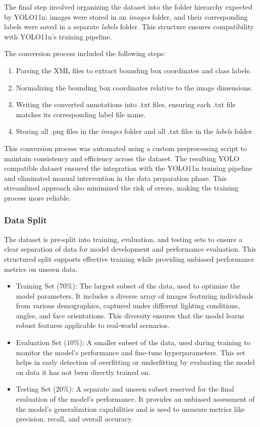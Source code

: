 \documentclass[11pt]{article}
\begin{document}
The final step involved organizing the dataset into the folder hierarchy expected by YOLO11n: images were stored in an \textit{images} folder, and their corresponding labels were saved in a separate \textit{labels} folder. This structure ensures compatibility with YOLO11n's training pipeline.

The conversion process included the following steps:

\begin{enumerate} 
    \item Parsing the XML files to extract bounding box coordinates and class labels. 
    \item Normalizing the bounding box coordinates relative to the image dimensions. 
    \item Writing the converted annotations into .txt files, ensuring each .txt file matches its corresponding label file name. 
    \item Storing all .png files in the \textit{images} folder and all .txt files in the \textit{labels} folder.
\end{enumerate}

This conversion process was automated using a custom preprocessing script to maintain consistency and efficiency across the dataset. The resulting YOLO compatible dataset ensured the integration with the YOLO11n training pipeline and eliminated manual intervention in the data preparation phase. This streamlined approach also minimized the risk of errors, making the training process more reliable.

\subsubsection{Data Split}
The dataset is pre-split into training, evaluation, and testing sets to ensure a clear separation of data for model development and performance evaluation. This structured split supports effective training while providing unbiased performance metrics on unseen data.

\begin{itemize}
    \item Training Set ($70\%$): The largest subset of the data, used to optimize the model parameters. It includes a diverse array of images featuring individuals from various demographics, captured under different lighting conditions, angles, and face orientations. This diversity ensures that the model learns robust features applicable to real-world scenarios.
    \item Evaluation Set ($10\%$): A smaller subset of the data, used during training to monitor the model’s performance and fine-tune hyperparameters. This set helps in early detection of overfitting or underfitting by evaluating the model on data it has not been directly trained on.
    \item Testing Set ($20\%$): A separate and unseen subset reserved for the final evaluation of the model's performance. It provides an unbiased assessment of the model’s generalization capabilities and is used to measure metrics like precision, recall, and overall accuracy.
\end{itemize}
\end{document}
